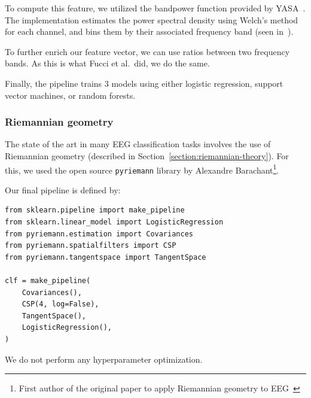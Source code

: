             To compute this feature, we utilized the bandpower function provided by YASA~\cite{vallat_yasa_2020}. The implementation estimates the power spectral density using Welch's method for each channel, and bins them by their associated frequency band (seen in~).

            To further enrich our feature vector, we can use ratios between two frequency bands. As this is what Fucci et al.\ did, we do the same.

            Finally, the pipeline trains 3 models using either logistic regression, support vector machines, or random forests.

        \subsubsection{Riemannian geometry}\label{section:method-riemannian}

            The state of the art in many EEG classification tasks involves the use of Riemannian geometry (described in Section~\ref{section:riemannian-theory}). For this, we used the open source \texttt{pyriemann} library by Alexandre Barachant\footnote{First author of the original paper to apply Riemannian geometry to EEG~\cite{barachant_classification_2013}}.

            Our final pipeline is defined by:

\begin{verbatim}
from sklearn.pipeline import make_pipeline
from sklearn.linear_model import LogisticRegression
from pyriemann.estimation import Covariances
from pyriemann.spatialfilters import CSP
from pyriemann.tangentspace import TangentSpace

clf = make_pipeline(
    Covariances(),
    CSP(4, log=False),
    TangentSpace(),
    LogisticRegression(),
)
\end{verbatim}

            We do not perform any hyperparameter optimization.

